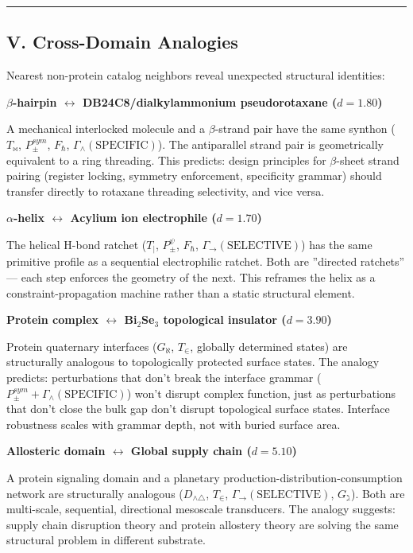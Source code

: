\documentclass[10pt,a4paper]{article}
\begin{document}
\begin{center}
\rule{0.5\textwidth}{0.4pt}
\end{center}

\subsection{V. Cross-Domain Analogies}

Nearest non-protein catalog neighbors reveal unexpected structural identities:

\textbf{$\beta$-hairpin $\leftrightarrow$ DB24C8/dialkylammonium pseudorotaxane ($d = 1.80$)}

A mechanical interlocked molecule and a $\beta$-strand pair have the same synthon ($T_\bowtie$, $P_\pm^{sym}$, $F_\hbar$, $\Gamma_\wedge(\text{SPECIFIC})$). The antiparallel strand pair is geometrically equivalent to a ring threading. This predicts: design principles for $\beta$-sheet strand pairing (register locking, symmetry enforcement, specificity grammar) should transfer directly to rotaxane threading selectivity, and vice versa.

\textbf{$\alpha$-helix $\leftrightarrow$ Acylium ion electrophile ($d = 1.70$)}

The helical H-bond ratchet ($T_{\vert}$, $P_\pm^\psi$, $F_\hbar$, $\Gamma_\to(\text{SELECTIVE})$) has the same primitive profile as a sequential electrophilic ratchet. Both are ''directed ratchets'' --- each step enforces the geometry of the next. This reframes the helix as a constraint-propagation machine rather than a static structural element.

\textbf{Protein complex $\leftrightarrow$ Bi$_2$Se$_3$ topological insulator ($d = 3.90$)}

Protein quaternary interfaces ($G_\aleph$, $T_\in$, globally determined states) are structurally analogous to topologically protected surface states. The analogy predicts: perturbations that don't break the interface grammar ($P_\pm^{sym} + \Gamma_\wedge(\text{SPECIFIC})$) won't disrupt complex function, just as perturbations that don't close the bulk gap don't disrupt topological surface states. Interface robustness scales with grammar depth, not with buried surface area.

\textbf{Allosteric domain $\leftrightarrow$ Global supply chain ($d = 5.10$)}

A protein signaling domain and a planetary production-distribution-consumption network are structurally analogous ($D_{\wedge\triangle}$, $T_\in$, $\Gamma_\to(\text{SELECTIVE})$, $G_\gimel$). Both are multi-scale, sequential, directional mesoscale transducers. The analogy suggests: supply chain disruption theory and protein allostery theory are solving the same structural problem in different substrate.
\end{document}
